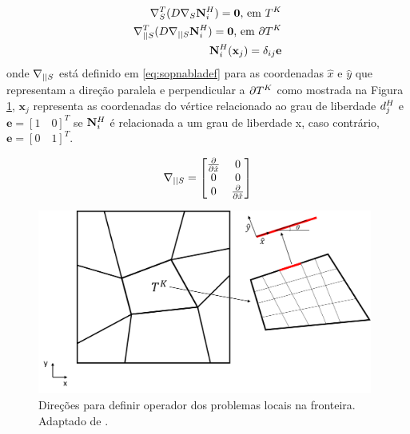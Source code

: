 \begin{subequations} \label{eq:problemaslocais}
\begin{align}
\sopnabla ^T (D \sopnabla \basefunctioncoarse)  = \mathbf{0} \text{,   em   } \coarseelement \label{eq:operadorlocal}\\
\sopnablafront ^ T ( D  \sopnablafront \basefunctioncoarse) = \mathbf{0}  \text{,   em   } \partial \coarseelement  \label{eq:operadoraresta}\\
\basefunctioncoarse(\mathbf{x}_j) = \delta_{ij} \mathbf{e}
\label{eq:valorvertice}
\end{align}
\end{subequations}
onde $\sopnablafront$ está definido em \eqref{eq:sopnabladef} para as coordenadas $\hat{x}$ e $\hat{y}$ que representam a direção paralela e perpendicular a $\partial \coarseelement$ como mostrada na Figura \ref{fig:direcoesoperadorfronteira}, $\mathbf{x}_j$ representa as coordenadas do vértice relacionado ao grau de liberdade $\freedomcoarse[j]$ e  $\mathbf{e} = [1\quad0]^T $ se $\basefunctioncoarse$ é relacionada a um grau de liberdade x, caso contrário,  $\mathbf{e}=[0\quad1]^T$.

\begin{equation}\label{eq:sopnabladef}
\sopnablafront = \begin{bmatrix}
\dxhat  & 0 \\ 
0 & 0 \\ 
0 & \dxhat 
\end{bmatrix}
\end{equation}


\begin{figure}[!htbp]
\centering
\includegraphics[width=11cm]{chap06/figs/direcoesoperadorfronteira.png}
\caption{Direções para definir operador dos problemas locais na fronteira. Adaptado de \cite{casteletto}.}
\label{fig:direcoesoperadorfronteira}
\end{figure}


